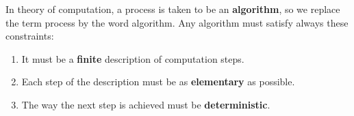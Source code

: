 In theory of computation, a process is taken to be an \textbf{algorithm}, so we replace the term process by the word algorithm. Any algorithm must satisfy always
these constraints:
\begin{enumerate}
    \item It must be a \textbf{finite} description of computation steps.
    \item Each step of the description must be as \textbf{elementary} as possible.
    \item The way the next step is achieved must be \textbf{deterministic}. 
\end{enumerate}